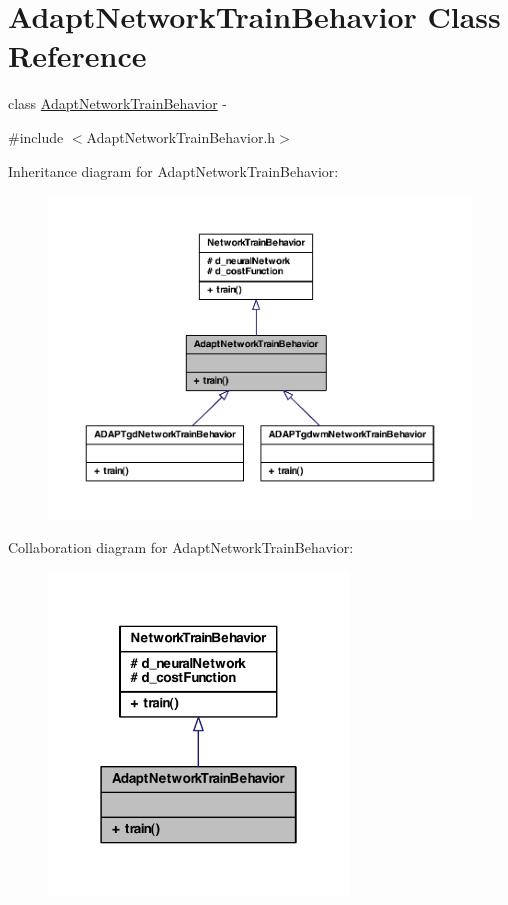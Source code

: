 \hypertarget{class_adapt_network_train_behavior}{
\section{AdaptNetworkTrainBehavior Class Reference}
\label{class_adapt_network_train_behavior}
}


class \hyperlink{class_adapt_network_train_behavior}{AdaptNetworkTrainBehavior} -\/  




{\ttfamily \#include $<$AdaptNetworkTrainBehavior.h$>$}



Inheritance diagram for AdaptNetworkTrainBehavior:
\nopagebreak
\begin{figure}[H]
\begin{center}
\leavevmode
\includegraphics[width=400pt]{class_adapt_network_train_behavior__inherit__graph}
\end{center}
\end{figure}


Collaboration diagram for AdaptNetworkTrainBehavior:
\nopagebreak
\begin{figure}[H]
\begin{center}
\leavevmode
\includegraphics[width=226pt]{class_adapt_network_train_behavior__coll__graph}
\end{center}
\end{figure}
